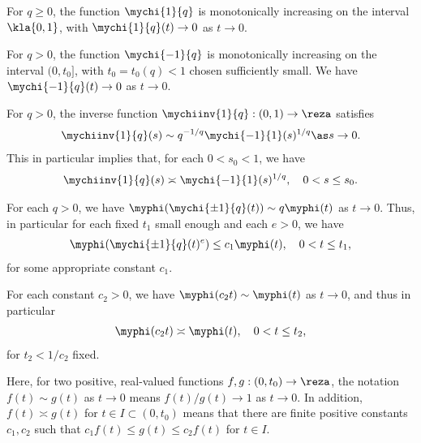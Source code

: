 \documentclass[10pt]{article}
\theoremstyle{definition}
\begin{document}
\begin{myenumerate_indent}
\item
\label{it:low_oder_prep_a}
For $ q \ge 0 $,
the function $ \mychi{1}{q} $ is monotonically increasing on the interval $ \kla{0,1}  $, with $ \mychi{1}{q}(t) \to 0 $ as $ t \to 0 $.

\item
\label{it:low_oder_prep_b}
For $ q > 0 $, the function $ \mychi{-1}{q} $ is monotonically increasing on the interval $ (0,t_0] $,
with $ t_0 = t_0(q) < 1 $ chosen sufficiently small.
We have $ \mychi{-1}{q}(t) \to 0 $ as $ t \to 0 $.

\item
\label{it:low_oder_prep_c}
For $ q > 0 $, the inverse function $ \mychiinv{1}{q}: (0,1) \to \reza $
satisfies
%
\begin{align*}
\mychiinv{1}{q}(s) \sim
q^{-1/q} \mychi{-1}{1}(s)^{1/q} \as s \to 0.
\end{align*}
%
This in particular implies that, for each $ 0 < s_0 < 1 $, we have
%
\begin{align*}
\mychiinv{1}{q}(s) \asymp \mychi{-1}{1}(s)^{1/q},
\quad 0 < s \le s_0.
\end{align*}

\item
\label{it:low_oder_prep_d}
For each $q > 0 $, we have
$ \myphi(\mychi{\pm 1}{q}(t)) \sim q \myphi(t) $ as $ t \to 0 $. Thus, in particular
%
for each fixed $ t_1 $ small enough and each $ e > 0 $, we have
%
\begin{align*}
\myphi(\mychi{\pm 1}{q}(t)^e) \le c_1 \myphi(t), \quad 0 < t \le t_1,
\end{align*}
for some appropriate constant $ c_1 $.


\item
\label{it:low_oder_prep_e}
For each constant $ c_2 > 0 $, we have
%
$ \myphi(c_2t) \sim \myphi(t) $ as $ t \to 0 $,
%
and thus in particular
%
\begin{align*}
\myphi(c_2t) \asymp \myphi(t), \quad 0 < t \le t_2,
\end{align*}
%
for $ t_2 < 1/c_2 $ fixed.
\end{myenumerate_indent}
%
Here, for two positive, real-valued functions $ f, g: (0,t_0) \to \reza $, the notation $ f(t) \sim g(t) $ as $ t \to 0 $ means $ f(t)/g(t) \to 1 $ as $ t \to 0 $. In addition, $ f(t) \asymp g(t) $ for $ t \in I \subset (0,t_0) $ means that there are finite positive constants $ c_1, c_2 $ such that
$ c_1 f(t) \le g(t) \le c_2 f(t) $ for $ t \in I $.
%
\end{document}

